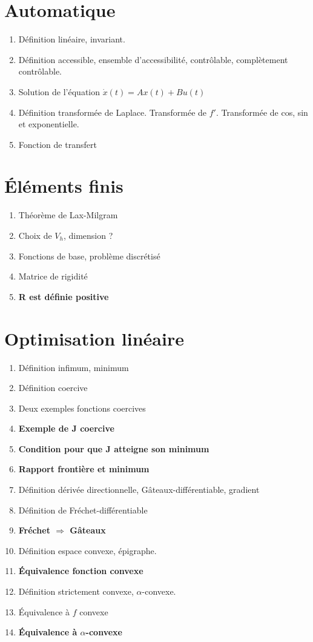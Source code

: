 \documentclass{article}
\begin{document}
\setcounter{tocdepth}{4}
\tableofcontents
\newpage

\part{Automatique}
\begin{enumerate}
\item Définition linéaire, invariant.
\item Définition accessible, ensemble d'accessibilité, contrôlable, complètement contrôlable.
\item Solution de l'équation $\dot{x}(t)=Ax(t)+Bu(t)$
\item Définition transformée de Laplace. Transformée de $f'$. Transformée de cos, sin et exponentielle.
\item Fonction de transfert
\end{enumerate}

\part{\'El\'ements finis}
\begin{enumerate}
\item Théorème de Lax-Milgram
\item Choix de $V_h$, dimension ?
\item Fonctions de base, problème discrétisé
\item Matrice de rigidité
\item \textbf{R est définie positive}
\end{enumerate}

\part{Optimisation linéaire}
\begin{enumerate}
\item Définition infimum, minimum
\item Définition coercive
\item Deux exemples fonctions coercives
\item \textbf{Exemple de J coercive}
\item \textbf{Condition pour que J atteigne son minimum}
\item \textbf{Rapport frontière et minimum}
\item Définition dérivée directionnelle, Gâteaux-différentiable, gradient
\item Définition de Fréchet-différentiable
\item \textbf{Fréchet $\Rightarrow$ Gâteaux}
\item Définition espace convexe, épigraphe.
\item \textbf{Équivalence fonction convexe}
\item Définition strictement convexe, $\alpha$-convexe.
\item Équivalence à $f$ convexe
\item \textbf{Équivalence à $\alpha$-convexe}
\end{enumerate}
\end{document}
